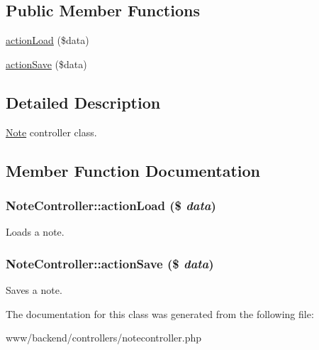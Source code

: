 \subsection*{Public Member Functions}
\begin{DoxyCompactItemize}
\item 
\hyperlink{classNoteController_a70a266f1601d67ef3f2b98473a50f711}{actionLoad} (\$data)
\item 
\hyperlink{classNoteController_ad5e5e2f53534b34885e39c7f553ab6e7}{actionSave} (\$data)
\end{DoxyCompactItemize}


\subsection{Detailed Description}
\hyperlink{classNote}{Note} controller class. 

\subsection{Member Function Documentation}
\hypertarget{classNoteController_a70a266f1601d67ef3f2b98473a50f711}{
\subsubsection[{actionLoad}]{\setlength{\rightskip}{0pt plus 5cm}NoteController::actionLoad (\$ {\em data})}}
\label{classNoteController_a70a266f1601d67ef3f2b98473a50f711}
Loads a note. \hypertarget{classNoteController_ad5e5e2f53534b34885e39c7f553ab6e7}{
\subsubsection[{actionSave}]{\setlength{\rightskip}{0pt plus 5cm}NoteController::actionSave (\$ {\em data})}}
\label{classNoteController_ad5e5e2f53534b34885e39c7f553ab6e7}
Saves a note. 

The documentation for this class was generated from the following file:\begin{DoxyCompactItemize}
\item 
www/backend/controllers/notecontroller.php\end{DoxyCompactItemize}
